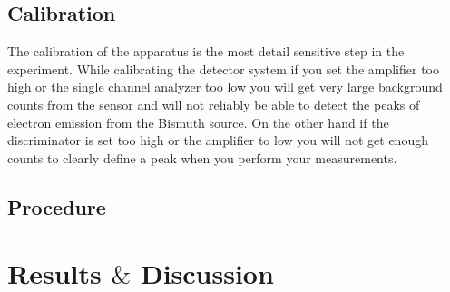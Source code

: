 \subsection{Calibration}
The calibration of the apparatus is the most detail sensitive step in the experiment.  While calibrating the detector system if you set the amplifier too high or the single channel analyzer too low you will get very large background counts from the sensor and will not reliably be able to detect the peaks of electron emission from the Bismuth source.  On the other hand if the discriminator is set too high or the amplifier to low you will not get enough counts to clearly define a peak when you perform your measurements. 
\subsection{Procedure}

\section{Results $\&$ Discussion}

